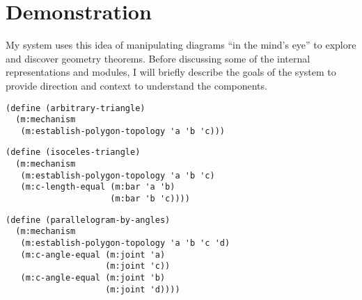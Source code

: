 \chapter{Demonstration}
\label{chap:demo}

My system uses this idea of manipulating diagrams ``in the mind's
eye'' to explore and discover geometry theorems. Before discussing
some of the internal representations and modules, I will briefly
describe the goals of the system to provide direction and context to
understand the components.


\begin{lstlisting}[firstnumber=1, caption=Getting labels, label=glabels]
(define (arbitrary-triangle)
  (m:mechanism
   (m:establish-polygon-topology 'a 'b 'c)))
\end{lstlisting}

\begin{lstlisting}[caption=Constraint Solving for Isoceles Triangle, label=glabels]
(define (isoceles-triangle)
  (m:mechanism
   (m:establish-polygon-topology 'a 'b 'c)
   (m:c-length-equal (m:bar 'a 'b)
                     (m:bar 'b 'c))))
\end{lstlisting}


\begin{lstlisting}[caption=Constraint Solving for Isoceles Triangle, label=glabels]
(define (parallelogram-by-angles)
  (m:mechanism
   (m:establish-polygon-topology 'a 'b 'c 'd)
   (m:c-angle-equal (m:joint 'a)
                    (m:joint 'c))
   (m:c-angle-equal (m:joint 'b)
                    (m:joint 'd))))
\end{lstlisting}
